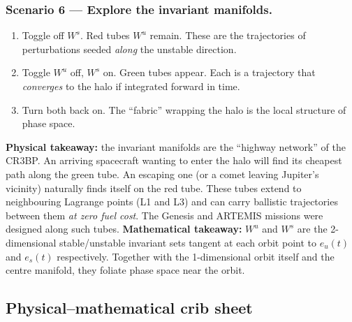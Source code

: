 \documentclass[11pt,a4paper]{article}
\begin{document}
\subsubsection*{Scenario 6 --- Explore the invariant manifolds.}
\begin{enumerate}[leftmargin=*]
  \item Toggle off $W^s$. Red tubes $W^u$ remain. These are the trajectories of perturbations seeded \emph{along} the unstable direction.
  \item Toggle $W^u$ off, $W^s$ on. Green tubes appear. Each is a trajectory that \emph{converges} to the halo if integrated forward in time.
  \item Turn both back on. The ``fabric'' wrapping the halo is the local structure of phase space.
\end{enumerate}
\textbf{Physical takeaway:} the invariant manifolds are the ``highway network'' of the CR3BP. An arriving spacecraft wanting to enter the halo will find its cheapest path along the green tube. An escaping one (or a comet leaving Jupiter's vicinity) naturally finds itself on the red tube. These tubes extend to neighbouring Lagrange points (L1 and L3) and can carry ballistic trajectories between them \emph{at zero fuel cost}. The Genesis and ARTEMIS missions were designed along such tubes.
\textbf{Mathematical takeaway:} $W^u$ and $W^s$ are the 2-dimensional stable/unstable invariant sets tangent at each orbit point to $e_u(t)$ and $e_s(t)$ respectively. Together with the 1-dimensional orbit itself and the centre manifold, they foliate phase space near the orbit.

\subsection{Physical--mathematical crib sheet}\label{sec:demo:crib}
\end{document}
